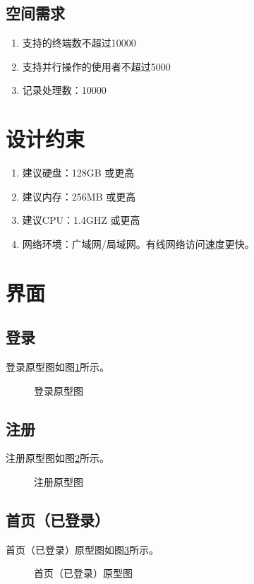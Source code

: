 \subsection{空间需求}
\begin{enumerate}
    \item 支持的终端数不超过10000
    \item 支持并行操作的使用者不超过5000
    \item 记录处理数：10000
\end{enumerate}
\section{设计约束}
\begin{enumerate}
    \item 建议硬盘：128GB 或更高
    \item 建议内存：256MB 或更高
    \item 建议CPU：1.4GHZ 或更高
    \item 网络环境：广域网/局域网。有线网络访问速度更快。
\end{enumerate}
\section{界面}
\subsection{登录}
登录原型图如图\ref{fig:login}所示。
\begin{figure}[htbp]
    \centering
    \caption{登录原型图}\label{fig:login}
    \vspace{\baselineskip} %
\end{figure}
\subsection{注册}
注册原型图如图\ref{fig:register}所示。
\begin{figure}[htbp]
    \centering
    \caption{注册原型图}\label{fig:register}
    \vspace{\baselineskip} %
\end{figure}

\subsection{首页（已登录）}
首页（已登录）原型图如图\ref{home(login)}所示。
\begin{figure}[htbp]
    \centering
    \caption{首页（已登录）原型图}\label{home(login)}
    \vspace{\baselineskip} %
\end{figure}

